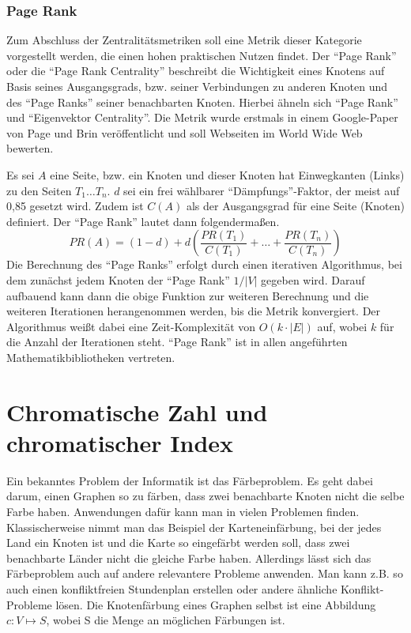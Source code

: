 \documentclass[a4paper,12pt,ngerman,chapterprefix=false,listof=totoc,bibliography=totoc]{scrreprt}
\begin{document}
\subsubsection*{Page Rank}
{
Zum Abschluss der Zentralitätsmetriken soll eine Metrik dieser Kategorie vorgestellt werden, die einen hohen praktischen Nutzen findet. Der "`Page Rank"' oder die "`Page Rank Centrality"' beschreibt die Wichtigkeit eines Knotens auf Basis seines Ausgangsgrads, bzw. seiner Verbindungen zu anderen Knoten und des "`Page Ranks"' seiner benachbarten Knoten. Hierbei ähneln sich "`Page Rank"' und "`Eigenvektor Centrality"'. Die Metrik wurde erstmals in einem Google-Paper von Page und Brin veröffentlicht und soll Webseiten im World Wide Web bewerten. \cite{brin_anatomy_1998}

Es sei \(A\) eine Seite, bzw. ein Knoten und dieser Knoten hat Einwegkanten (Links) zu den Seiten \(T_1\dots T_n\). \(d\) sei ein frei wählbarer "`Dämpfungs"'-Faktor, der meist auf 0,85 gesetzt wird. Zudem ist \(C(A)\) als der Ausgangsgrad für eine Seite (Knoten) definiert. Der "`Page Rank"' lautet dann folgendermaßen.
\[
	PR(A) = (1-d)+d(\frac{PR(T_1)}{C(T_1)}+\dots +\frac{PR(T_n)}{C(T_n)})
\]
Die Berechnung des "`Page Ranks"' erfolgt durch einen iterativen Algorithmus, bei dem zunächst jedem Knoten der "`Page Rank"' \(1/|V|\) gegeben wird. Darauf aufbauend kann dann die obige Funktion zur weiteren Berechnung und die weiteren Iterationen herangenommen werden, bis die Metrik konvergiert. Der Algorithmus weißt dabei eine Zeit-Komplexität von \(O(k\cdot |E|)\) auf, wobei \(k\) für die Anzahl der Iterationen steht. \cite{oracle_pagerank_2017} "`Page Rank"' ist in allen angeführten Mathematikbibliotheken vertreten. \cite{sagemath_generic_nodate,wolfram_graph_2020,matlab_measure_2020}
}
\section{Chromatische Zahl und chromatischer Index}
{
Ein bekanntes Problem der Informatik ist das Färbeproblem. Es geht dabei darum, einen Graphen so zu färben, dass zwei benachbarte Knoten nicht die selbe Farbe haben. Anwendungen dafür kann man in vielen Problemen finden. Klassischerweise nimmt man das Beispiel der Karteneinfärbung, bei der jedes Land ein Knoten ist und die Karte so eingefärbt werden soll, dass zwei benachbarte Länder nicht die gleiche Farbe haben. Allerdings lässt sich das Färbeproblem auch auf andere relevantere Probleme anwenden. Man kann z.B. so auch einen konfliktfreien Stundenplan erstellen oder andere ähnliche Konflikt-Probleme lösen. Die Knotenfärbung eines Graphen selbst ist eine Abbildung \(c: V\mapsto S\), wobei S die Menge an möglichen Färbungen ist. \cite{diestel_graphentheorie_2000,aigner_graphentheorie_2015} 
}
\end{document}
